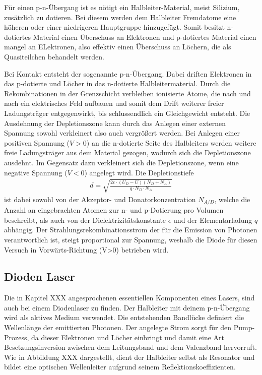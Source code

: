 Für einen p-n-Übergang ist es nötigt ein Halbleiter-Material, meist Silizium, zusätzlich zu dotieren. Bei diesem werden dem Halbleiter Fremdatome eine höheren oder einer niedrigeren Hauptgruppe hinzugefügt. Somit besitzt n-dotiertes Material einen Überschuss an Elektronen und p-dotiertes Material einen mangel an ELektronen, also effektiv einen Überschuss an Löchern, die als Quasiteilchen behandelt werden. 

Bei Kontakt entsteht der sogenannte p-n-Übergang. Dabei driften Elektronen in das p-dotierte und Löcher in das n-dotierte Halbleitermaterial. Durch die Rekombinationen in der Grenzschicht verbleiben ionisierte Atome, die nach und nach ein elektrisches Feld aufbauen und somit dem Drift weiterer freier Ladungsträger entgegenwirkt, bis schlussendlich ein Gleichgewicht entsteht. Die Ausdehnung der Depletionszone kann durch das Anlegen einer externen Spannung sowohl verkleinert also auch vergrößert werden. Bei Anlegen einer positiven Spannung ($V>0$) an die n-dotierte Seite des Halbleiters werden weitere freie Ladungsträger aus dem Material gezogen, wodurch sich die Depletionszone ausdehnt. Im Gegensatz dazu verkleinert sich die Depletionszone, wenn eine negative Spannung ($V<0$) angelegt wird. Die Depletionstiefe
\begin{align}
	d=\sqrt{\frac{2\epsilon\cdot(U_D-U)(N_D+N_A)}{q\cdot N_D\cdot N_A}}
\end{align} 
ist dabei sowohl von der Akzeptor- und Donatorkonzentration $N_{A/D}$, welche die Anzahl an eingebrachten Atomen zur n- und p-Dotierung pro Volumen beschreibt, als auch von der Dielektrizitätskonstante $\epsilon$ und der Elementarladung $q$ abhängig. Der Strahlungsrekombinationsstrom der für die Emission von Photonen verantwortlich ist, steigt proportional zur Spannung, weshalb die Diode für diesen Versuch in Vorwärts-Richtung (V>0) betrieben wird.

\subsection{Dioden Laser}
Die in Kapitel XXX angesprochenen essentiellen Komponenten eines Lasers, sind auch bei einem Diodenlaser zu finden. Der Halbleiter mit deinem p-n-Übergang wird als aktives Medium verwendet. Die entstehenden Bandlücke definiert die Wellenlänge der emittierten Photonen. Der angelegte Strom sorgt für den Pump-Prozess, da dieser Elektronen und Löcher einbringt und damit eine Art Besetzungsinversion zwischen dem Leitungsband und dem Valenzband hervorruft. Wie in Abbildung XXX dargestellt, dient der Halbleiter selbst als Resonator und bildet eine optischen Wellenleiter aufgrund seinem Reflektionskoeffizienten. 


